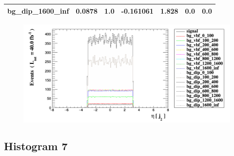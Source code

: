 \documentclass[a4paper, 10pt]{article}
\begin{document}
\begin{table}[H]
\begin{center}
\begin{tabular}{|m{23.0mm}|m{23.0mm}|m{18.0mm}|m{19.0mm}|m{19.0mm}|m{19.0mm}|m{19.0mm}|}
      \hline
      {\cellcolor{white}         bg\_dip\_1600\_inf}& {\cellcolor{white}         0.0878}& {\cellcolor{white}         1.0}& {\cellcolor{white}         -0.161061}& {\cellcolor{white}         1.828}& {\cellcolor{green}         0.0}& {\cellcolor{green}         0.0}\\
\hline
    \end{tabular}
  \end{center}
\end{table}

\begin{figure}[H]
  \begin{center}
    \includegraphics[scale=0.45]{selection_5.png}\\
\caption{   }
  \end{center}
\end{figure}
      \newpage
\subsection{ Histogram 7}
\end{document}
